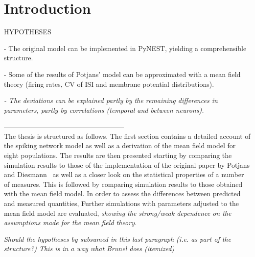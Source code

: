 \section{Introduction}
\label{sec:intro}

HYPOTHESES

- The original model can be implemented in PyNEST, yielding a 
comprehensible structure.

- Some of the results of Potjans' model can be approximated with a 
mean field theory (firing rates, CV of ISI and membrane potential
distributions).

\emph{- The deviations can be explained partly by the remaining differences 
in parameters, partly by correlations (temporal and between neurons).}

-----------------------------------------------------\\












The thesis is structured as follows. The first section contains a detailed account 
of the spiking network model as well as a derivation of the mean field model 
for eight populations.  
The results are then presented starting by comparing the simulation results to 
those of the implementation of the original paper by Potjans and 
Diesmann~\cite{potjans2014} as well as a closer look on the statistical properties 
of a number of measures. This is followed by comparing simulation results to those
obtained with the mean field model. In order to assess the differences between 
predicted and measured quantities, 
Further simulations with parameters adjusted 
to the mean field model are evaluated, 
\emph{showing the strong/weak dependence on the assumptions made for the mean
field theory.}

\emph{Should the hypotheses by subsumed in this last paragraph (i.e. as part of the structure?)
This is in a way what Brunel does (itemized)}


